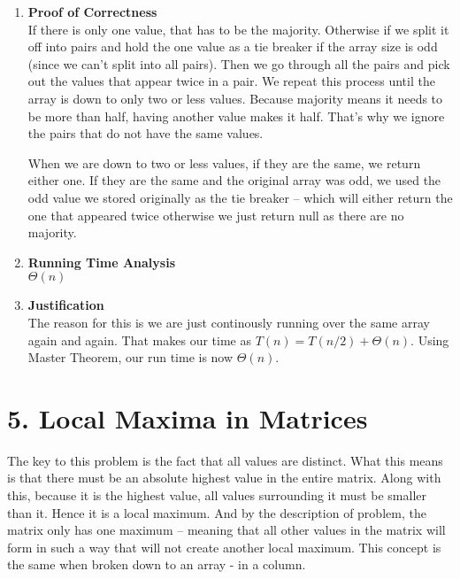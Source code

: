 \documentclass[11pt]{article}
\newenvironment{qparts}{\begin{enumerate}[{(}a{)}]}{\end{enumerate}}
\begin{document}
\begin{qparts}
\begin{qparts}
\begin{minipage}{\linewidth}
\begin{lstlisting}
		\end{lstlisting}
		\end{minipage}
		
	\item[] \textbf{Proof of Correctness} \\
	If there is only one value, that has to be the majority. Otherwise if we split it off into pairs and hold the one value as a tie breaker if the array size is odd (since we can't split into all pairs). Then we go through all the pairs and pick out the values that appear twice in a pair. We repeat this process until the array is down to only two or less values. Because majority means it needs to be more than half, having another value makes it half. That's why we ignore the pairs that do not have the same values. 
	
	When we are down to two or less values, if they are the same, we return either one. If they are the same and the original array was odd, we used the odd value we stored originally as the tie breaker -- which will either return the one that appeared twice otherwise we just return null as there are no majority. 

	
	\item[] \textbf{Running Time Analysis} \\
	$\Theta(n)$
	
	\item[] \textbf{Justification} \\
	The reason for this is we are just continously running over the same array again and again. That makes our time as $T(n) = T(n/2) + \Theta(n)$. Using Master Theorem, our run time is now $\Theta(n)$.
	
	
\end{qparts}
	
	
\end{qparts}


\newpage
\section*{5. Local Maxima in Matrices}
The key to this problem is the fact that all values are distinct. What this means is that there must be an absolute highest value in the entire matrix. Along with this, because it is the highest value, all values surrounding it must be smaller than it. Hence it is a local maximum. And by the description of problem, the matrix only has one maximum -- meaning that all other values in the matrix will form in such a way that will not create another local maximum. This concept is the same when broken down to an array - in a column. \\
\end{document}
